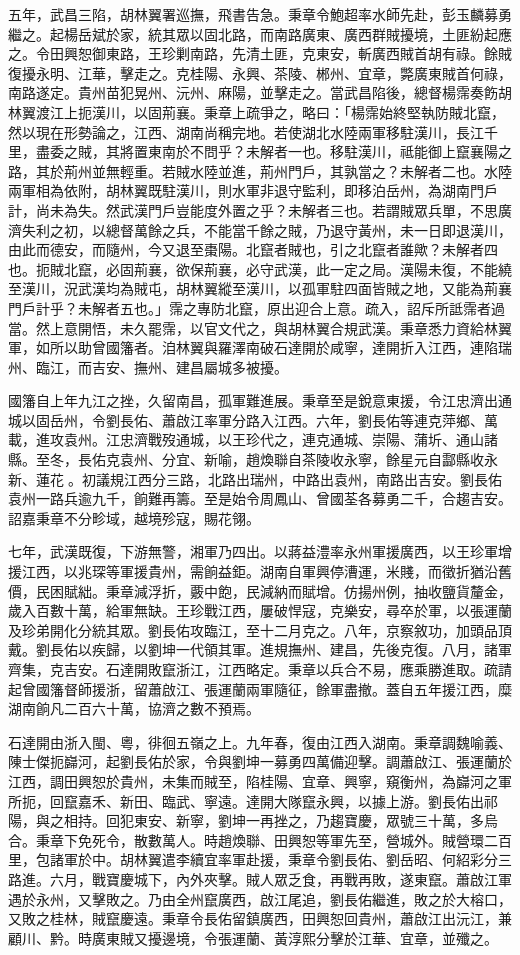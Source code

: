 \begin{pinyinscope}
五年，武昌三陷，胡林翼署巡撫，飛書告急。秉章令鮑超率水師先赴，彭玉麟募勇繼之。起楊岳斌於家，統其眾以固北路，而南路廣東、廣西群賊擾境，土匪紛起應之。令田興恕御東路，王珍剿南路，先清土匪，克東安，斬廣西賊首胡有祿。餘賊復擾永明、江華，擊走之。克桂陽、永興、茶陵、郴州、宜章，斃廣東賊首何祿，南路遂定。貴州苗犯晃州、沅州、麻陽，並擊走之。當武昌陷後，總督楊霈奏飭胡林翼渡江上扼漢川，以固荊襄。秉章上疏爭之，略曰：「楊霈始終堅執防賊北竄，然以現在形勢論之，江西、湖南尚稱完地。若使湖北水陸兩軍移駐漢川，長江千里，盡委之賊，其將置東南於不問乎？未解者一也。移駐漢川，祗能御上竄襄陽之路，其於荊州並無輕重。若賊水陸並進，荊州門戶，其孰當之？未解者二也。水陸兩軍相為依附，胡林翼既駐漢川，則水軍非退守監利，即移泊岳州，為湖南門戶計，尚未為失。然武漢門戶豈能度外置之乎？未解者三也。若謂賊眾兵單，不思廣濟失利之初，以總督萬餘之兵，不能當千餘之賊，乃退守黃州，未一日即退漢川，由此而德安，而隨州，今又退至棗陽。北竄者賊也，引之北竄者誰歟？未解者四也。扼賊北竄，必固荊襄，欲保荊襄，必守武漢，此一定之局。漢陽未復，不能繞至漢川，況武漢均為賊屯，胡林翼縱至漢川，以孤軍駐四面皆賊之地，又能為荊襄門戶計乎？未解者五也。」霈之專防北竄，原出迎合上意。疏入，詔斥所詆霈者過當。然上意開悟，未久罷霈，以官文代之，與胡林翼合規武漢。秉章悉力資給林翼軍，如所以助曾國籓者。洎林翼與羅澤南破石達開於咸寧，達開折入江西，連陷瑞州、臨江，而吉安、撫州、建昌屬城多被擾。

國籓自上年九江之挫，久留南昌，孤軍難進展。秉章至是銳意東援，令江忠濟出通城以固岳州，令劉長佑、蕭啟江率軍分路入江西。六年，劉長佑等連克萍鄉、萬載，進攻袁州。江忠濟戰歿通城，以王珍代之，連克通城、崇陽、蒲圻、通山諸縣。至冬，長佑克袁州、分宜、新喻，趙煥聯自茶陵收永寧，餘星元自酃縣收永新、蓮花。初議規江西分三路，北路出瑞州，中路出袁州，南路出吉安。劉長佑袁州一路兵逾九千，餉難再籌。至是始令周鳳山、曾國荃各募勇二千，合趨吉安。詔嘉秉章不分畛域，越境殄寇，賜花翎。

七年，武漢既復，下游無警，湘軍乃四出。以蔣益澧率永州軍援廣西，以王珍軍增援江西，以兆琛等軍援貴州，需餉益鉅。湖南自軍興停漕運，米賤，而徵折猶沿舊價，民困賦絀。秉章減浮折，覈中飽，民減納而賦增。仿揚州例，抽收鹽貨釐金，歲入百數十萬，給軍無缺。王珍戰江西，屢破悍寇，克樂安，尋卒於軍，以張運蘭及珍弟開化分統其眾。劉長佑攻臨江，至十二月克之。八年，京察敘功，加頭品頂戴。劉長佑以疾歸，以劉坤一代領其軍。進規撫州、建昌，先後克復。八月，諸軍齊集，克吉安。石達開敗竄浙江，江西略定。秉章以兵合不易，應乘勝進取。疏請起曾國籓督師援浙，留蕭啟江、張運蘭兩軍隨征，餘軍盡撤。蓋自五年援江西，糜湖南餉凡二百六十萬，協濟之數不預焉。

石達開由浙入閩、粵，徘徊五嶺之上。九年春，復由江西入湖南。秉章調魏喻義、陳士傑扼巋河，起劉長佑於家，令與劉坤一募勇四萬備迎擊。調蕭啟江、張運蘭於江西，調田興恕於貴州，未集而賊至，陷桂陽、宜章、興寧，窺衡州，為巋河之軍所扼，回竄嘉禾、新田、臨武、寧遠。達開大隊竄永興，以據上游。劉長佑出祁陽，與之相持。回犯東安、新寧，劉坤一再挫之，乃趨寶慶，眾號三十萬，多烏合。秉章下免死令，散數萬人。時趙煥聯、田興恕等軍先至，營城外。賊營環二百里，包諸軍於中。胡林翼遣李續宜率軍赴援，秉章令劉長佑、劉岳昭、何紹彩分三路進。六月，戰寶慶城下，內外夾擊。賊人眾乏食，再戰再敗，遂東竄。蕭啟江軍遇於永州，又擊敗之。乃由全州竄廣西，啟江尾追，劉長佑繼進，敗之於大榕口，又敗之桂林，賊竄慶遠。秉章令長佑留鎮廣西，田興恕回貴州，蕭啟江出沅江，兼顧川、黔。時廣東賊又擾邊境，令張運蘭、黃淳熙分擊於江華、宜章，並殲之。


\end{pinyinscope}

